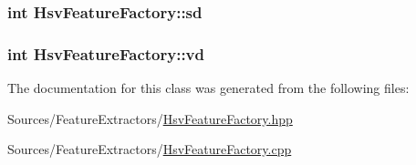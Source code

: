 \hypertarget{class_hsv_feature_factory_afd7c786338d314feac8a95224f0c6f7d}{
\subsubsection[{sd}]{\setlength{\rightskip}{0pt plus 5cm}int Hsv\+Feature\+Factory\+::sd\hspace{0.3cm}{\ttfamily [private]}}}\label{class_hsv_feature_factory_afd7c786338d314feac8a95224f0c6f7d}
\hypertarget{class_hsv_feature_factory_a57ee7c097f73c331d22452e3a83cb9f5}{
\subsubsection[{vd}]{\setlength{\rightskip}{0pt plus 5cm}int Hsv\+Feature\+Factory\+::vd\hspace{0.3cm}{\ttfamily [private]}}}\label{class_hsv_feature_factory_a57ee7c097f73c331d22452e3a83cb9f5}


The documentation for this class was generated from the following files\+:\begin{DoxyCompactItemize}
\item 
Sources/\+Feature\+Extractors/\hyperlink{_hsv_feature_factory_8hpp}{Hsv\+Feature\+Factory.\+hpp}\item 
Sources/\+Feature\+Extractors/\hyperlink{_hsv_feature_factory_8cpp}{Hsv\+Feature\+Factory.\+cpp}\end{DoxyCompactItemize}
